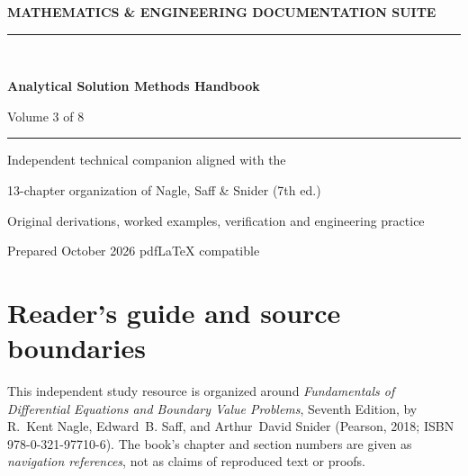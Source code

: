 \documentclass[11pt,letterpaper,oneside]{report}
\theoremstyle{definition}\newtheorem{definition}[theorem]{Definition}
\theoremstyle{remark}\newtheorem{remark}[theorem]{Remark}
\begin{document}
\hypersetup{pageanchor=false}%
\begin{titlepage}
\pagecolor{navy}\color{white}
\vspace*{0.75in}
{\sffamily\bfseries\large MATHEMATICS \& ENGINEERING DOCUMENTATION SUITE\\[12pt]}
{\color{cyan!40}\rule{\textwidth}{2pt}}\\[1.0in]
{\sffamily\bfseries\fontsize{29}{36}\selectfont Analytical Solution Methods Handbook\par}
\vspace{0.45in}
{\Large Volume 3 of 8}\par\vspace{0.55in}
{\color{cyan!30}\rule{0.50\textwidth}{1pt}}\par\vspace{0.3in}
{\large Independent technical companion aligned with the\par}
{\large 13-chapter organization of Nagle, Saff \& Snider (7th ed.)\par}
\vfill
{\large Original derivations, worked examples, verification and engineering practice\par}\vspace{0.3in}
{\small Prepared October 2026 \quad\textbullet\quad pdf\LaTeX{} compatible\par}
\end{titlepage}\hypersetup{pageanchor=true}
\nopagecolor\color{ink}
\chapter*{Reader's guide and source boundaries}
This independent study resource is organized around \emph{Fundamentals of Differential Equations and Boundary Value Problems}, Seventh Edition, by R.~Kent Nagle, Edward~B. Saff, and Arthur~David Snider (Pearson, 2018; ISBN 978-0-321-97710-6). The book's chapter and section numbers are given as \emph{navigation references}, not as claims of reproduced text or proofs.
\end{document}
